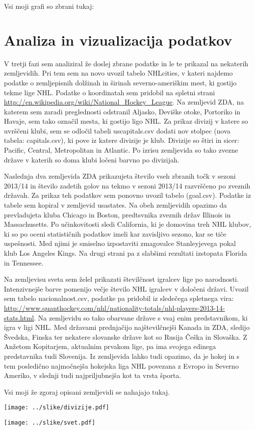 \documentclass[11pt,a4paper]{article}
\begin{document}
Vsi moji grafi so zbrani tukaj:



\section{Analiza in vizualizacija podatkov}

V tretji fazi sem analiziral že doslej zbrane podatke in le te prikazal na nekaterih zemljevidih. Pri tem sem na novo uvozil tabelo NHLcities, v kateri najdemo podatke o zemljepisnih dolžinah in širinah severno-ameriškim mest, ki gostijo tekme lige NHL. Podatke o koordinatah sem pridobil na spletni strani \url{http://en.wikipedia.org/wiki/National_Hockey_League}. Na zemljevid ZDA, na katerem sem zaradi preglednosti odstranil Aljasko, Deviške otoke, Portoriko in Havaje, sem tako označil mesta, ki gostijo ligo NHL.
Za prikaz divizij v katere so uvrščeni klubi, sem se odločil tabeli uscapitals.csv dodati nov stolpec (nova tabela: capitals.csv), ki pove iz katere divizije je klub. Divizije so štiri in sicer: Pacific, Central, Metropolitan in Atlantic. Po izrisu zemljevida so tako zvezne države v katerih so doma klubi ločeni barvno po divizijah. 

Naslednja dva zemljevida ZDA prikazujeta število vseh zbranih točk v sezoni 2013/14 in število zadetih golov na tekmo v sezoni 2013/14 razvrščeno po zveznih državah. Za prikaz teh podatkov sem ponovno uvozil tabelo (goal.csv). Podatke iz tabele sem kopiral v zemljevid usastates. Na obeh zemljevidih opazimo da prevladujeta kluba Chicago in Boston, predtsvnika zveznih držav Illinois in Massachusetts. Po učinkovitosti sledi California, ki je domovina treh NHL klubov, ki so po oceni statističnih podatkov imeli kar zavisljivo sezono, kar se tiče uspešnosti. Med njimi je smiselno izpostaviti zmagovalce Stanleyjevega pokal klub Los Angeles Kings. Na drugi strani pa z slabšimi rezultati izstopata Florida in Tennessee.

Na zemljevisu sveta sem želel prikazati številčnost igralcev lige po narodnosti. Intenzivnejše barve pomenijo večje število NHL igralcev v določeni državi. Uvozil sem tabelo nacionalnost.csv, podatke pa pridobil iz sledečega spletnega vira: \url{http://www.quanthockey.com/nhl/nationality-totals/nhl-players-2013-14-stats.html}. Na zemljevidu so tako obarvane države s vsaj enim predstavnikom, ki igra v ligi NHL. Med državami prednjačijo najštevilčnejši Kanada in ZDA, sledijo Švedska, Finska ter nekatere slovanske države kot so Rusija Češka in Slovaška. Z Anžetom Kopitarjem, aktualnim prvakom lige, pa ima svojega edinega predstavnika tudi Slovenija. Iz zemljevida lahko tudi opazimo, da je hokej in s tem posledično najmočnejša hokejska liga NHL povezana z Evropo in Severno Ameriko, v slednji tudi najpriljubnejša kot ta vrsta športa.
\newpage

Vsi moji že zgoraj opisani zemljevidi se nahajajo tukaj.

\texttt{[image: ../slike/divizije.pdf]}



\texttt{[image: ../slike/svet.pdf]}
\end{document}

